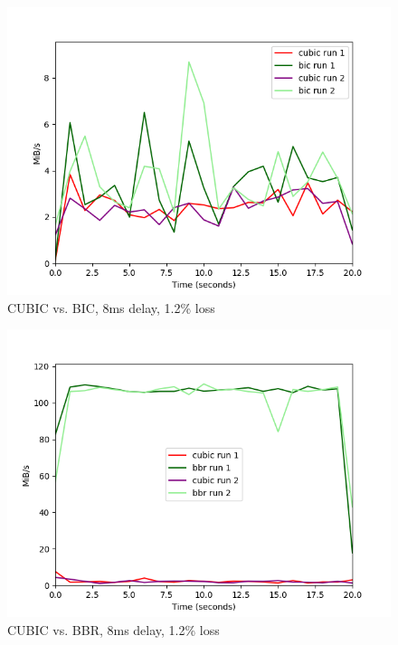 \documentclass{article}
\begin{document}
\begin{figure}[H]
	\includegraphics{cubic_vs_bic_8_12.png}
	\caption{CUBIC vs. BIC, 8ms delay, 1.2\% loss}
	\label{fig:cubic-bic-8-12}
\end{figure}

\begin{figure}[H]
	\includegraphics{cubic_vs_bbr_8_12.png}
	\caption{CUBIC vs. BBR, 8ms delay, 1.2\% loss}
	\label{fig:cubic-bbr-8-12}
\end{figure}
\end{document}
